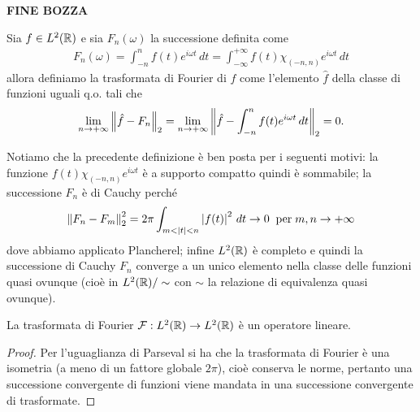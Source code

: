 \textbf{FINE BOZZA}

\begin{definition}[ ]
  Sia $ f \in L^2(\mathbb{R}) $ e sia $ F_n(\omega) $ la successione definita come 
  \begin{align}
    F_n(\omega) = \int_{-n}^{n} f(t) e^{i\omega t} \,dt= \int_{-\infty}^{+\infty} f(t) \chi_{(-n , n)} e^{i\omega t} \, dt
  \end{align}  
  allora definiamo la trasformata di Fourier di $ f $ come l'elemento $ \hat{f} $ della classe di funzioni uguali q.o. tali che 
  \begin{align}
    \lim_{n\to+\infty} \left\lVert \hat{f} - F_n \right\rVert_2 = \lim_{n\to+\infty} \left\lVert \hat{f} - \int_{-n}^{n} f(t) e^{i\omega t} \,dt \right\rVert_2 = 0.
  \end{align}
\end{definition}

Notiamo che la precedente definizione è ben posta per i seguenti motivi: la funzione $ f(t) \chi_{(-n, n)} e^{i\omega t} $ è a supporto compatto quindi 
è sommabile; la successione $ F_n $ è di Cauchy perché
\begin{align}
  \left\lVert F_n - F_m \right\rVert_2^2 = 2\pi \int_{m < \left|{t}\right| < n} \left|{f(t)}\right|^2 \,dt \to 0 \;\; \textnormal{per}\; m,n \to +\infty
\end{align}
dove abbiamo applicato Plancherel; infine $ L^2(\mathbb{R}) $ è completo e quindi la successione di Cauchy $ F_n $ converge a un unico elemento nella classe delle 
funzioni quasi ovunque (cioè in $ L^2(\mathbb{R})/\sim $ con $ \sim $ la relazione di equivalenza quasi ovunque).

\begin{lemma}[  ]
  La trasformata di Fourier $ \operatorname{\mathcal{F}}: L^2(\mathbb{R}) \to L^2(\mathbb{R}) $ è un operatore lineare.
\end{lemma}
\begin{proof}
  Per l'uguaglianza di Parseval si ha che la trasformata di Fourier è una isometria (a meno di un fattore globale $ 2\pi $), 
  cioè conserva le norme, pertanto una successione convergente di funzioni viene mandata in una successione convergente di trasformate.
\end{proof}


